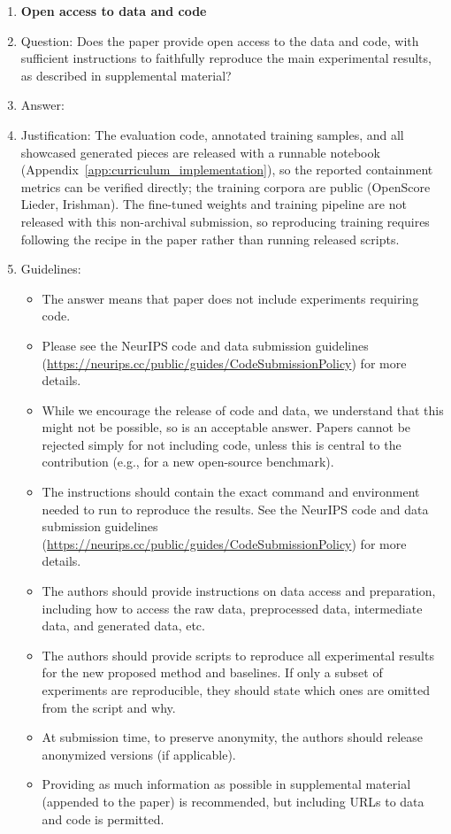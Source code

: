 \documentclass{article}
\begin{document}
\begin{enumerate}
\item {\bf Open access to data and code}
    \item[] Question: Does the paper provide open access to the data and code, with sufficient instructions to faithfully reproduce the main experimental results, as described in supplemental material?
    \item[] Answer: \answerYes{}
    \item[] Justification: The evaluation code, annotated training samples, and all showcased generated pieces are released with a runnable notebook (Appendix~\ref{app:curriculum_implementation}), so the reported containment metrics can be verified directly; the training corpora are public (OpenScore Lieder, Irishman). The fine-tuned weights and training pipeline are not released with this non-archival submission, so reproducing training requires following the recipe in the paper rather than running released scripts.
    \item[] Guidelines:
    \begin{itemize}
        \item The answer \answerNA{} means that paper does not include experiments requiring code.
        \item Please see the NeurIPS code and data submission guidelines (\url{https://neurips.cc/public/guides/CodeSubmissionPolicy}) for more details.
        \item While we encourage the release of code and data, we understand that this might not be possible, so \answerNo{} is an acceptable answer. Papers cannot be rejected simply for not including code, unless this is central to the contribution (e.g., for a new open-source benchmark).
        \item The instructions should contain the exact command and environment needed to run to reproduce the results. See the NeurIPS code and data submission guidelines (\url{https://neurips.cc/public/guides/CodeSubmissionPolicy}) for more details.
        \item The authors should provide instructions on data access and preparation, including how to access the raw data, preprocessed data, intermediate data, and generated data, etc.
        \item The authors should provide scripts to reproduce all experimental results for the new proposed method and baselines. If only a subset of experiments are reproducible, they should state which ones are omitted from the script and why.
        \item At submission time, to preserve anonymity, the authors should release anonymized versions (if applicable).
        \item Providing as much information as possible in supplemental material (appended to the paper) is recommended, but including URLs to data and code is permitted.
    \end{itemize}



\end{enumerate}
\end{document}
